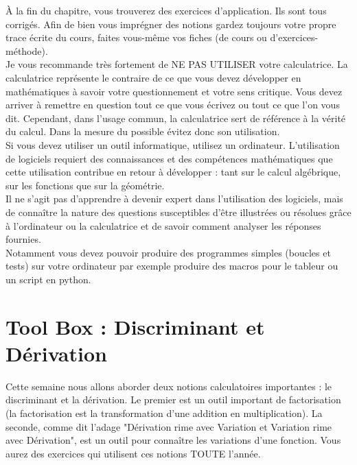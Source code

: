 \documentclass[12pt,fleqn]{report} %
\begin{document}
\`A la fin du chapitre, vous trouverez des exercices d'application. Ils sont tous corrigés. Afin de bien vous imprégner des notions gardez toujours votre propre trace écrite du cours, faites vous-même vos fiches (de cours ou d'exercices-méthode). \\

Je vous recommande très fortement de NE PAS UTILISER votre calculatrice. La calculatrice représente le contraire de ce que vous devez développer en mathématiques à savoir votre questionnement et votre sens critique. Vous devez arriver à remettre en question tout ce que vous écrivez ou tout ce que l'on vous dit. Cependant, dans l'usage commun, la calculatrice sert de référence à la vérité du calcul. Dans la mesure du possible évitez donc son utilisation. \\

Si vous devez utiliser un outil informatique, utilisez un ordinateur. L'utilisation de logiciels requiert des connaissances et des compétences mathématiques que cette utilisation contribue en retour à développer : tant sur le calcul algébrique, sur les fonctions que sur la géométrie.\\

Il ne s'agit pas d'apprendre à devenir expert dans l'utilisation des logiciels, mais de connaître la nature des questions susceptibles d'être illustrées ou résolues grâce à l'ordinateur ou la calculatrice et de savoir comment analyser les réponses fournies.\\

Notamment vous devez pouvoir produire des programmes simples (boucles et tests) sur votre ordinateur par exemple produire des macros pour le tableur ou un script en python.





\tableofcontents

\setcounter{chapter}{0}

\chapter{Tool Box : Discriminant et Dérivation}

Cette semaine nous allons aborder deux notions calculatoires importantes : le discriminant et la dérivation. Le premier est un outil important de factorisation (la factorisation est la transformation d'une addition en multiplication). La seconde, comme dit l'adage "Dérivation rime avec Variation et Variation rime avec Dérivation", est un outil pour connaître les variations d'une fonction. Vous aurez des exercices qui utilisent ces notions TOUTE l'année.
\end{document}
